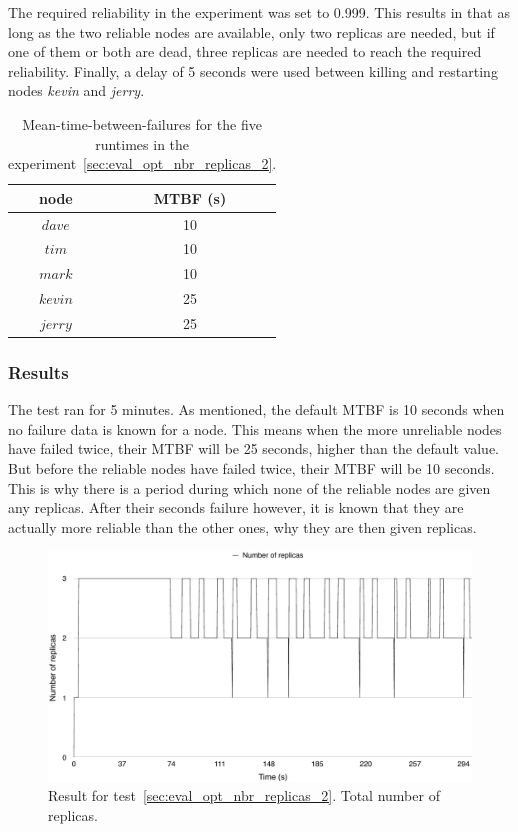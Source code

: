 \documentclass{cslthse-msc}
\begin{document}
The required reliability in the experiment was set to 0.999. This results in that as long as the two reliable nodes are available, only two replicas are needed, but if one of them or both are dead, three replicas are needed to reach the required reliability. Finally, a delay of 5 seconds were used between killing and restarting nodes \emph{kevin} and \emph{jerry}.


\begin{table}[h]
	\begin{center}
	\begin{tabular}{| c | c |}
	 \hline
	 node & MTBF (s) \\
	 \hline		
	  $dave$ & 10 \\
	  $tim$ & 10 \\
	  $mark$ & 10 \\
	  $kevin$ & 25 \\
	  $jerry$ & 25 \\
	   \hline
	\end{tabular}
	 \caption{Mean-time-between-failures for the five runtimes in the experiment~\ref{sec:eval_opt_nbr_replicas_2}.}
	 \label{table:exp_nodes_means_2}
	 \end{center}
 \end{table}


\subsubsection*{Results}
The test ran for 5 minutes. As mentioned, the default MTBF is 10 seconds when no failure data is known for a node. This means when the more unreliable nodes have failed twice, their MTBF will be 25 seconds, higher than the default value. But before the reliable nodes have failed twice, their MTBF will be 10 seconds. This is why there is a period during which none of the reliable nodes are given any replicas. After their seconds failure however, it is known that they are actually more reliable than the other ones, why they are then given replicas.

\begin{figure}[!hbt]
\centering
\includegraphics[scale=0.5]{images/results/optimal_replicas/2/total.pdf}
\caption{Result for test~\ref{sec:eval_opt_nbr_replicas_2}. Total number of replicas.} \label{fig:exp_opt_replicas_total_2}
\end{figure}
\end{document}
